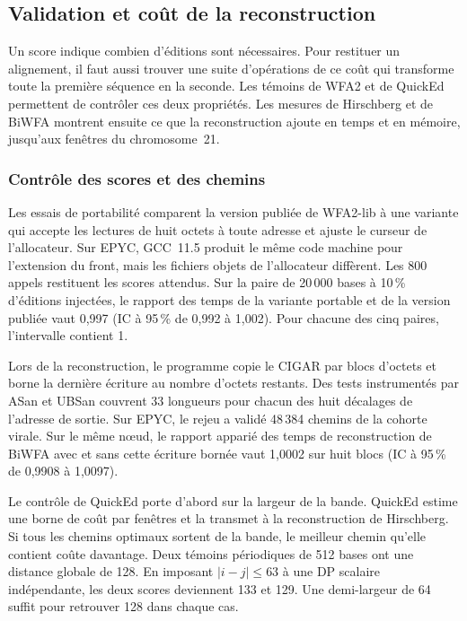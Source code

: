 \subsection{Validation et coût de la reconstruction}\label{sec:reconstruction}
Un score indique combien d’éditions sont nécessaires. Pour restituer un alignement, il faut aussi trouver une suite d’opérations de ce coût qui transforme toute la première séquence en la seconde. Les témoins de WFA2 et de QuickEd permettent de contrôler ces deux propriétés. Les mesures de Hirschberg et de BiWFA montrent ensuite ce que la reconstruction ajoute en temps et en mémoire, jusqu’aux fenêtres du chromosome~21.

\subsubsection{Contrôle des scores et des chemins}\label{sec:quicked}
Les essais de portabilité comparent la version publiée de WFA2-lib à une variante qui accepte les lectures de huit octets à toute adresse et ajuste le curseur de l’allocateur. Sur EPYC, GCC~11.5 produit le même code machine pour l’extension du front, mais les fichiers objets de l’allocateur diffèrent. Les 800 appels restituent les scores attendus. Sur la paire de 20\,000 bases à 10\,\% d’éditions injectées, le rapport des temps de la variante portable et de la version publiée vaut 0,997 (IC à 95\,\% de 0,992 à 1,002). Pour chacune des cinq paires, l’intervalle contient 1.

Lors de la reconstruction, le programme copie le CIGAR par blocs d’octets et borne la dernière écriture au nombre d’octets restants. Des tests instrumentés par ASan et UBSan couvrent 33 longueurs pour chacun des huit décalages de l’adresse de sortie. Sur EPYC, le rejeu a validé 48\,384 chemins de la cohorte virale. Sur le même nœud, le rapport apparié des temps de reconstruction de BiWFA avec et sans cette écriture bornée vaut 1,0002 sur huit blocs (IC à 95\,\% de 0,9908 à 1,0097).

Le contrôle de QuickEd porte d’abord sur la largeur de la bande. QuickEd estime une borne de coût par fenêtres et la transmet à la reconstruction de Hirschberg. Si tous les chemins optimaux sortent de la bande, le meilleur chemin qu’elle contient coûte davantage. Deux témoins périodiques de 512 bases ont une distance globale de 128. En imposant \(\lvert i-j\rvert\le63\) à une DP scalaire indépendante, les deux scores deviennent 133 et 129. Une demi-largeur de 64 suffit pour retrouver 128 dans chaque cas.

